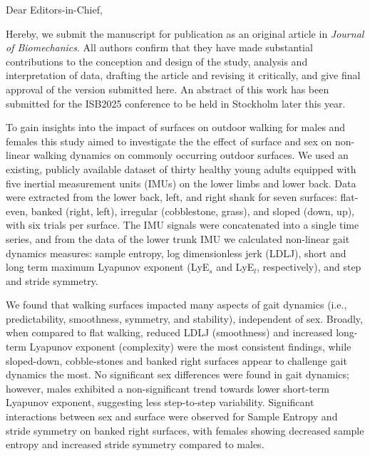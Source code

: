 \documentclass{letter}
\begin{document}
\longindentation=0pt

\begin{letter}{}
\opening{Dear Editors-in-Chief,}

Hereby, we submit the manuscript  for publication as an original article in \textit{Journal of Biomechanics}. All authors confirm that they have made substantial contributions to the conception and design of the study, analysis and interpretation of data, drafting the article and revising it critically, and give final approval of the version submitted here. An abstract of this work has been submitted for the ISB2025 conference to be held in Stockholm later this year. 

To gain insights into the impact of surfaces on outdoor walking for males and females this study aimed to investigate the the effect of surface and sex on non-linear walking dynamics on commonly occurring outdoor surfaces.
We used an existing, publicly available dataset of thirty healthy young adults equipped with five inertial measurement units (IMUs) on the lower limbs and lower back. Data were extracted from the lower back, left, and right shank for seven surfaces: flat-even, banked (right, left), irregular (cobblestone, grass), and sloped (down, up), with six trials per surface. The IMU signals were concatenated into a single time series, and from the data of the lower trunk IMU we calculated non-linear gait dynamics measures: sample entropy, log dimensionless jerk (LDLJ), short and long term maximum Lyapunov exponent (LyE$_{s}$ and LyE$_{l}$, respectively), and step and stride symmetry.

We found that walking surfaces impacted many aspects of gait dynamics (i.e., predictability, smoothness, symmetry, and stability), independent of sex. Broadly, when compared to flat walking, reduced LDLJ (smoothness) and increased long-term Lyapunov exponent (complexity) were the most consistent findings, while sloped-down, cobble-stones and banked right surfaces appear to challenge gait dynamics the most. No significant sex differences were found in gait dynamics; however, males exhibited a non-significant trend towards lower short-term Lyapunov exponent, suggesting less step-to-step variability. Significant interactions between sex and surface were observed for Sample Entropy and stride symmetry on banked right surfaces, with females showing decreased sample entropy and increased stride symmetry compared to males.


\end{letter}
\end{document}
